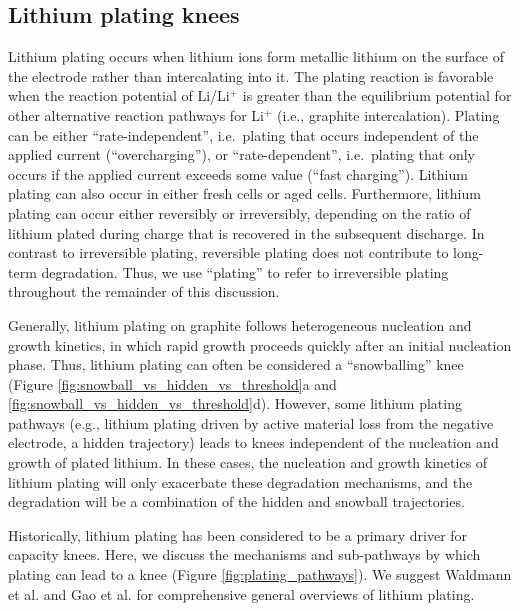 \documentclass[journal=jpclcd,manuscript=article]{achemso}
\begin{document}
\subsection{Lithium plating knees}

Lithium plating occurs when lithium ions form metallic lithium on the surface of the electrode rather than intercalating into it. The plating reaction is favorable when the reaction potential of Li/Li$^+$ is greater than the equilibrium potential for other alternative reaction pathways for Li$^+$ (i.e., graphite intercalation).\cite{gao_interplay_2021} Plating can be either ``rate-independent'', i.e.\ plating that occurs independent of the applied current (``overcharging''), or ``rate-dependent'', i.e.\ plating that only occurs if the applied current exceeds some value (``fast charging'').
Lithium plating can also occur in either fresh cells or aged cells.
Furthermore, lithium plating can occur either reversibly or irreversibly, depending on the ratio of lithium plated during charge that is recovered in the subsequent discharge.\cite{baure_synthetic_2019, dubarry_big_2020} In contrast to irreversible plating, reversible plating does not contribute to long-term degradation. Thus, we use ``plating'' to refer to irreversible plating throughout the remainder of this discussion.

Generally, lithium plating on graphite follows heterogeneous nucleation and growth kinetics, in which rapid growth proceeds quickly after an initial nucleation phase.\cite{ely_heterogeneous_2013, pei_nanoscale_2017, gao_interplay_2021}
Thus, lithium plating can often be considered a ``snowballing'' knee (Figure \ref{fig:snowball_vs_hidden_vs_threshold}a and \ref{fig:snowball_vs_hidden_vs_threshold}d). However, some lithium plating pathways (e.g., lithium plating driven by active material loss from the negative electrode, a hidden trajectory) leads to knees independent of the nucleation and growth of plated lithium.
In these cases, the nucleation and growth kinetics of lithium plating will only exacerbate these degradation mechanisms, and the degradation will be a combination of the hidden and snowball trajectories.

Historically, lithium plating has been considered to be a primary driver for capacity knees. Here, we discuss the mechanisms and sub-pathways by which plating can lead to a knee (Figure \ref{fig:plating_pathways}). We suggest Waldmann et al.\cite{waldmann_li_2018} and Gao et al.\cite{gao_interplay_2021} for comprehensive general overviews of lithium plating.
\end{document}
